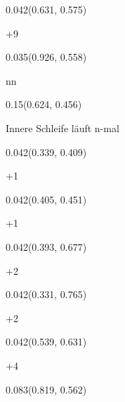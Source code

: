 \documentclass[aspectratio=169]{beamer}
\begin{document}
\begin{frame}[fragile]
\begin{textblock}{0.042}(0.631, 0.575)
  \begin{minipage}[t][0.044\paperheight]{\linewidth}
    {\tiny +9}
  \end{minipage}
\end{textblock}
\begin{textblock}{0.035}(0.926, 0.558)
  \begin{minipage}[t][0.054\paperheight]{\linewidth}
    {\tiny *n\n*n}
  \end{minipage}
\end{textblock}
\begin{textblock}{0.15}(0.624, 0.456)
  \begin{minipage}[t][0.094\paperheight]{\linewidth}
    {\small Innere Schleife läuft n-mal}
  \end{minipage}
\end{textblock}
\begin{textblock}{0.042}(0.339, 0.409)
  \begin{minipage}[t][0.044\paperheight]{\linewidth}
    {\tiny +1}
  \end{minipage}
\end{textblock}
\begin{textblock}{0.042}(0.405, 0.451)
  \begin{minipage}[t][0.044\paperheight]{\linewidth}
    {\tiny +1}
  \end{minipage}
\end{textblock}
\begin{textblock}{0.042}(0.393, 0.677)
  \begin{minipage}[t][0.044\paperheight]{\linewidth}
    {\tiny +2}
  \end{minipage}
\end{textblock}
\begin{textblock}{0.042}(0.331, 0.765)
  \begin{minipage}[t][0.044\paperheight]{\linewidth}
    {\tiny +2}
  \end{minipage}
\end{textblock}
\begin{textblock}{0.042}(0.539, 0.631)
  \begin{minipage}[t][0.044\paperheight]{\linewidth}
    {\tiny +4}
  \end{minipage}
\end{textblock}
\begin{textblock}{0.083}(0.819, 0.562)
  \begin{minipage}[t][0.044\paperheight]{\linewidth}

\end{minipage}
\end{textblock}
\end{frame}
\end{document}
